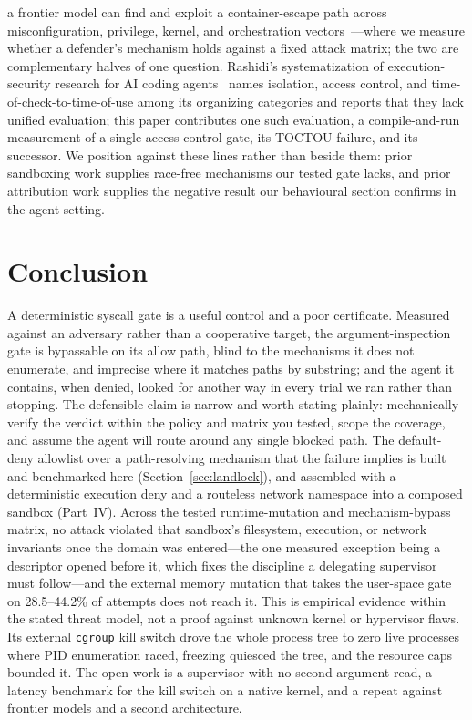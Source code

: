 \documentclass[11pt]{article}
\begin{document}
a frontier model can find and exploit a container-escape path across misconfiguration, privilege,
kernel, and orchestration vectors~\cite{sandboxescape}---where we measure whether a defender's mechanism
holds against a fixed attack matrix; the two are complementary halves of one question. Rashidi's
systematization of execution-security research for AI coding agents~\cite{sok26} names isolation, access
control, and time-of-check-to-time-of-use among its organizing categories and reports that they lack
unified evaluation; this paper contributes one such evaluation, a compile-and-run measurement of a
single access-control gate, its TOCTOU failure, and its successor. We position against these lines rather
than beside them: prior sandboxing work supplies race-free mechanisms our tested gate lacks, and prior
attribution work supplies the negative result our behavioural section confirms in the agent setting.

\section{Conclusion}\label{sec:conclusion}

A deterministic syscall gate is a useful control and a poor certificate. Measured against an adversary
rather than a cooperative target, the argument-inspection gate is bypassable on its allow path, blind to
the mechanisms it does not enumerate, and imprecise where it matches paths by substring; and the agent it
contains, when denied, looked for another way in every trial we ran rather than stopping. The defensible claim is narrow and worth
stating plainly: mechanically verify the verdict within the policy and matrix you tested, scope the
coverage, and assume the agent will route around any single blocked path. The default-deny allowlist over a path-resolving mechanism that the failure implies is built
and benchmarked here (Section~\ref{sec:landlock}), and assembled with a deterministic execution deny and a
routeless network namespace into a composed sandbox (Part~IV). Across the tested runtime-mutation and
mechanism-bypass matrix, no attack violated that sandbox's filesystem, execution, or network invariants
once the domain was entered---the one measured exception being a descriptor opened before it,
which fixes the discipline a delegating supervisor must follow---and the external memory mutation that
takes the user-space gate on 28.5--44.2\% of attempts does not reach it. This is empirical evidence within the
stated threat model, not a proof against unknown kernel or hypervisor flaws. Its external \texttt{cgroup}
kill switch drove the whole process tree to zero live processes where PID enumeration raced, freezing
quiesced the tree, and the resource caps bounded it. The open work is a supervisor with no second argument
read, a latency benchmark for the kill switch on a native kernel, and a repeat against frontier models and
a second architecture.
\end{document}
